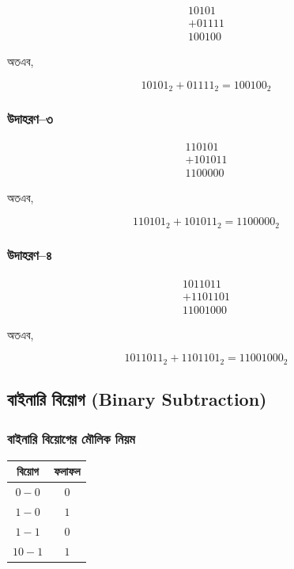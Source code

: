 \[
\begin{array}{r}
10101\\
+01111\\
\hline
100100
\end{array}
\]

অতএব,

\[
\boxed{10101_2+01111_2=100100_2}
\]

\subsubsection*{উদাহরণ--৩}

\[
\begin{array}{r}
110101\\
+101011\\
\hline
1100000
\end{array}
\]

অতএব,

\[
\boxed{110101_2+101011_2=1100000_2}
\]

\subsubsection*{উদাহরণ--৪}

\[
\begin{array}{r}
1011011\\
+1101101\\
\hline
11001000
\end{array}
\]

অতএব,

\[
\boxed{1011011_2+1101101_2=11001000_2}
\]


\subsection{বাইনারি বিয়োগ
(\textenglish{Binary Subtraction})}

\subsubsection*{বাইনারি বিয়োগের মৌলিক নিয়ম}

\begin{center}
\begin{tabular}{|c|c|}
\hline
\rowcolor{ICTLightBlue}
\textbf{বিয়োগ} & \textbf{ফলাফল} \\
\hline
$0-0$ & $0$ \\
\hline
$1-0$ & $1$ \\
\hline
$1-1$ & $0$ \\
\hline
$10-1$ & $1$ \\
\hline
\end{tabular}
\end{center}

